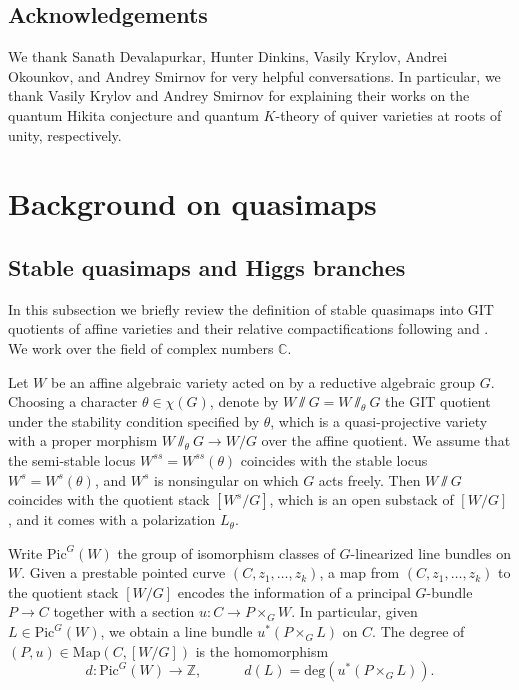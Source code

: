 \documentclass[reqno]{amsart}
\numberwithin{equation}{section}
\numberwithin{equation}{section}
\numberwithin{equation}{section}
\theoremstyle{definition}
\theoremstyle{remark}
\theoremstyle{remark}
\begin{document}
\subsection{Acknowledgements}
We thank Sanath Devalapurkar, Hunter Dinkins, Vasily Krylov, Andrei Okounkov, and Andrey Smirnov for very helpful conversations. In particular, we thank Vasily Krylov and Andrey Smirnov for explaining their works on the quantum Hikita conjecture and quantum $K$-theory of quiver varieties at roots of unity, respectively.

\section{Background on quasimaps}\label{sec:background}
\subsection{Stable quasimaps and Higgs branches}\label{ssec:oper-quasimaps}
In this subsection we briefly review the definition of stable quasimaps into GIT quotients of affine varieties and their relative compactifications following \cite{quasi-map} and \cite{Oko17}. We work over the field of complex numbers $\mathbb{C}$.

Let $W$ be an affine algebraic variety acted on by a reductive algebraic group $G$. Choosing a character $\theta \in \chi(G)$, denote by $W \! \sslash \! G = W \! \sslash_\theta \! G$ the GIT quotient under the stability condition specified by $\theta$, which is a quasi-projective variety with a proper morphism $W \! \sslash_\theta \! G \to W/G$ over the affine quotient. We assume that the semi-stable locus $W^{ss} = W^{ss}(\theta)$ coincides with the stable locus $W^s = W^s(\theta)$, and $W^s$ is nonsingular on which $G$ acts freely. Then $W \! \sslash \! G$ coincides with the quotient stack $[W^s/G]$, which is an open substack of $[W/G]$, and it comes with a polarization $L_{\theta}$.

Write $\mathrm{Pic}^G(W)$ the group of isomorphism classes of $G$-linearized line bundles on $W$. Given a prestable pointed curve $(C, z_1, \dots, z_k)$, a map from $(C, z_1, \dots, z_k)$ to the quotient stack $[W/G]$ encodes the information of a principal $G$-bundle $P \to C$ together with a section $u: C \to P \times_G W$. In particular, given $L \in \mathrm{Pic}^G(W)$, we obtain a line bundle $u^*(P \times_G L)$ on $C$. The degree of $(P, u) \in \mathrm{Map}(C, [W/G])$ is the homomorphism 
\begin{equation}
    d: \mathrm{Pic}^G(W) \to \mathbb{Z}, \quad \quad \quad d(L) = \mathrm{deg}(u^*(P \times_G L)).
\end{equation}
\end{document}
